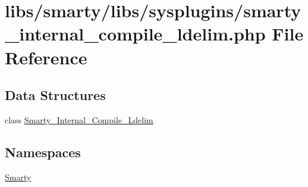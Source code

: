 \hypertarget{smarty__internal__compile__ldelim_8php}{}\section{libs/smarty/libs/sysplugins/smarty\+\_\+internal\+\_\+compile\+\_\+ldelim.php File Reference}
\label{smarty__internal__compile__ldelim_8php}
\subsection*{Data Structures}
\begin{DoxyCompactItemize}
\item 
class \hyperlink{class_smarty___internal___compile___ldelim}{Smarty\+\_\+\+Internal\+\_\+\+Compile\+\_\+\+Ldelim}
\end{DoxyCompactItemize}
\subsection*{Namespaces}
\begin{DoxyCompactItemize}
\item 
 \hyperlink{namespace_smarty}{Smarty}
\end{DoxyCompactItemize}
